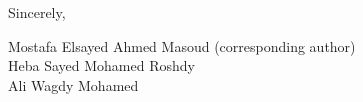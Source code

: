 \documentclass[11pt,a4paper]{article}
\begin{document}
\vspace{0.6em}

Sincerely,

\vspace{1.6em}

Mostafa Elsayed Ahmed Masoud \;(corresponding author)\\
Heba Sayed Mohamed Roshdy\\
Ali Wagdy Mohamed

\end{document}
